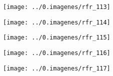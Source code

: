 \begin{rightcolumn}
 \begin{figure}
\centering
\texttt{[image: ../0.imagenes/rfr\_113]}
\end{figure}

 \begin{figure}
\centering
\texttt{[image: ../0.imagenes/rfr\_114]}
\end{figure}

 \begin{figure}
\centering
\texttt{[image: ../0.imagenes/rfr\_115]}
\end{figure}

 \begin{figure}
\centering
\texttt{[image: ../0.imagenes/rfr\_116]}
\end{figure}

 \begin{figure}
\centering
\texttt{[image: ../0.imagenes/rfr\_117]}
\end{figure}


\end{rightcolumn}